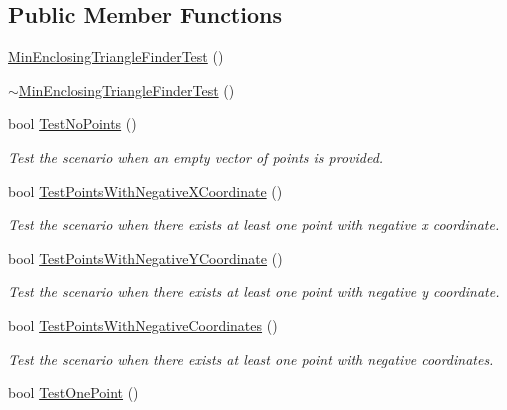 \subsection*{Public Member Functions}
\begin{DoxyCompactItemize}
\item 
\hyperlink{classmultiscaletest_1_1MinEnclosingTriangleFinderTest_a3139504b01d664351450b36043f4d4cf}{Min\-Enclosing\-Triangle\-Finder\-Test} ()
\item 
\hyperlink{classmultiscaletest_1_1MinEnclosingTriangleFinderTest_a08084468ad154583a03421f73554342f}{$\sim$\-Min\-Enclosing\-Triangle\-Finder\-Test} ()
\item 
bool \hyperlink{classmultiscaletest_1_1MinEnclosingTriangleFinderTest_abf17e8fc35a7dfb9c958cd8f234eb84b}{Test\-No\-Points} ()
\begin{DoxyCompactList}\small\item\em Test the scenario when an empty vector of points is provided. \end{DoxyCompactList}\item 
bool \hyperlink{classmultiscaletest_1_1MinEnclosingTriangleFinderTest_aff1757d754844957ff8cdd5b216fc949}{Test\-Points\-With\-Negative\-X\-Coordinate} ()
\begin{DoxyCompactList}\small\item\em Test the scenario when there exists at least one point with negative x coordinate. \end{DoxyCompactList}\item 
bool \hyperlink{classmultiscaletest_1_1MinEnclosingTriangleFinderTest_aeaa607f08758082d6259bcd196de0d66}{Test\-Points\-With\-Negative\-Y\-Coordinate} ()
\begin{DoxyCompactList}\small\item\em Test the scenario when there exists at least one point with negative y coordinate. \end{DoxyCompactList}\item 
bool \hyperlink{classmultiscaletest_1_1MinEnclosingTriangleFinderTest_a083222fe0267efedd5ceb2e646ea821d}{Test\-Points\-With\-Negative\-Coordinates} ()
\begin{DoxyCompactList}\small\item\em Test the scenario when there exists at least one point with negative coordinates. \end{DoxyCompactList}\item 
bool \hyperlink{classmultiscaletest_1_1MinEnclosingTriangleFinderTest_ae493a4386e26014e765afa13575d63b9}{Test\-One\-Point} ()

\end{DoxyCompactItemize}
